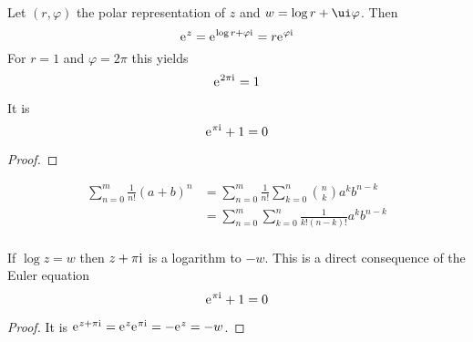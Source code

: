 Let \( (r, \varphi) \) the polar representation of \( z \) and \( w = \log r + \ui\varphi \). Then
\[
	\mathrm{e}\mkern1mu^z = \mathrm{e}\mkern1mu^{\log r + \varphi\mathrm{i}\mkern1mu} = r\mathrm{e}\mkern1mu^{\varphi\mathrm{i}\mkern1mu}
\]
For \( r = 1 \) and \( \varphi = 2\pi \) this yields
\[
	\mathrm{e}\mkern1mu^{2\pi\mathrm{i}\mkern1mu} = 1
\]

\begin{lemma}\label{lemma:lemma_euler_equation}
It is 
\[
	\mathrm{e}\mkern1mu^{\pi\mathrm{i}\mkern1mu} + 1 = 0
\]
\end{lemma}

\begin{proof}
\end{proof}
\bigskip


\begin{exercise}
\[
    \begin{split}
		\sum_{n=0}^m \frac{1}{n!} {(a + b)}^n	
			& = \sum_{n=0}^{m} \frac{1}{n!} \sum_{k=0}^{n} \binom{n}{k} a^{k}b^{n - k} \\
			& = \sum_{n=0}^{m} \sum_{k=0}^{n} \frac{1}{k!(n - k)!} a^{k}b^{n - k} \\
    \end{split}
\]  
\end{exercise}
\bigskip


\begin{exercise}
If \( \log z = w \) then \( z + \pi\mathrm{i}\mkern1mu \) is a logarithm to \( -w \). This is a direct consequence 
of the Euler equation
\[
	\mathrm{e}\mkern1mu^{\pi\mathrm{i}\mkern1mu} + 1 = 0
\]
\end{exercise}

\begin{proof}
It is \( \mathrm{e}\mkern1mu^{z + \pi\mathrm{i}\mkern1mu} = \mathrm{e}\mkern1mu^{z}\mathrm{e}\mkern1mu^{\pi\mathrm{i}\mkern1mu} = - \mathrm{e}\mkern1mu^{z} = -w \).

\end{proof}

